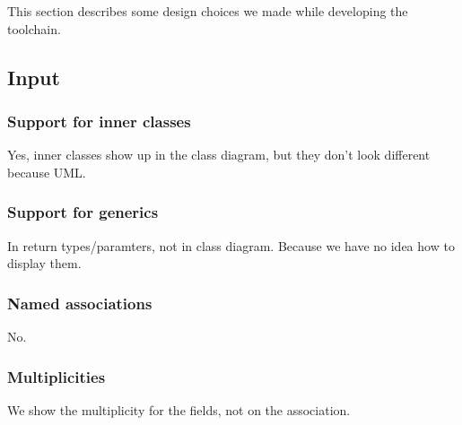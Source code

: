 This section describes some design choices we made while developing the toolchain.

\subsection{Input}
	\subsubsection{Support for inner classes}
		Yes, inner classes show up in the class diagram, but they don't look different because UML.
	\subsubsection{Support for generics}
		In return types/paramters, not in class diagram.
		Because we have no idea how to display them.

	\subsubsection{Named associations}
		No.
	\subsubsection{Multiplicities}
		We show the multiplicity for the fields, not on the association.

